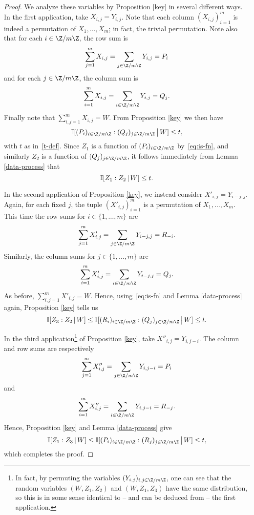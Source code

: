 \begin{proof}%
  We analyze these variables by Proposition \ref{key} in several different ways.
  In the first application, take $X_{i,j}=Y_{i,j}$.
  Note that each column $(X_{i,j})_{i=1}^m$ is indeed a permutation of $X_1,\dots,X_m$; in fact, the trivial permutation.
  Note also that for each $i \in \Z/m\Z$, the row sum is
  \[
    \sum_{j=1}^m X_{i,j} = \sum_{j \in \Z/m\Z} Y_{i,j} = P_i
  \]
  and for each $j \in \Z/m\Z$, the column sum is
  \[
    \sum_{i=1}^m X_{i,j} = \sum_{i \in \Z/m\Z} Y_{i,j} = Q_j.
  \]
  Finally note that $\sum_{i,j=1}^m X_{i,j} = W$.
  From Proposition \ref{key} we then have
  \[
    \bbI[ (P_i)_{i \in \Z/m\Z} : (Q_j)_{j \in \Z/m\Z } \,\big|\, W ] \leq t,
  \]
  with $t$ as in~\eqref{t-def}.
  Since $Z_1$ is a function of $(P_i)_{i \in \Z/m\Z}$ by~\eqref{eq:is-fn}, and similarly $Z_2$ is a function of $(Q_j)_{j \in \Z/m\Z}$, it follows immediately from Lemma \ref{data-process} that
  \[
    \mathbb{I}[ Z_1 : Z_2 \,|\, W ] \leq t.
  \]

  In the second application of Proposition \ref{key}, we instead consider $X'_{i,j} = Y_{i-j,j}$.
  Again, for each fixed $j$, the tuple $(X'_{i,j})_{i=1}^m$ is a permutation of $X_1,\dots,X_m$.
  This time the row sums for $i \in \{1,\dots, m\}$ are
  \[
    \sum_{j=1}^m X'_{i,j} = \sum_{j \in \Z/m\Z} Y_{i-j,j} = R_{-i}.
  \]
 Similarly, the column sums for $j \in \{1,\dots, m\}$ are
  \[
    \sum_{i=1}^m X'_{i,j} = \sum_{i \in \Z/m\Z} Y_{i-j,j} = Q_j.
  \]
  As before, $\sum_{i,j=1}^m X'_{i,j} = W$.
  Hence, using~\eqref{eq:is-fn} and Lemma \ref{data-process} again, Proposition \ref{key} tells us
  \[
    \bbI[ Z_3 :  Z_2 \,|\, W] \leq \bbI[ (R_i)_{i \in \Z/m\Z} : (Q_j)_{j \in \Z/m\Z } \,\big|\, W ] \leq t.
  \]

  In the third application\footnote{In fact, by permuting the variables $(Y_{i,j})_{i,j \in \Z/m\Z}$, one can see that the random variables $(W, Z_1, Z_2)$ and $(W, Z_1, Z_3)$ have the same distribution, so this is in some sense identical to -- and can be deduced from -- the first application.} of Proposition \ref{key}, take $X''_{i,j} = Y_{i,j-i}$.
  The column and row sums are respectively
  \[
    \sum_{j=1}^m X''_{i,j} = \sum_{j \in \Z/m\Z} Y_{i,j-i} = P_i \] and
\[     \sum_{i=1}^m X''_{i,j} = \sum_{i \in \Z/m\Z} Y_{i,j-i} = R_{-j}.
  \]
  Hence, Proposition \ref{key} and Lemma \ref{data-process} give
  \[
    \bbI[ Z_1 : Z_3 \,|\, W] \leq \bbI[ (P_i)_{i \in \Z/m\Z} : (R_j)_{j \in \Z/m\Z } \,\big|\, W ] \leq t,
  \]
  which completes the proof.
\end{proof}

